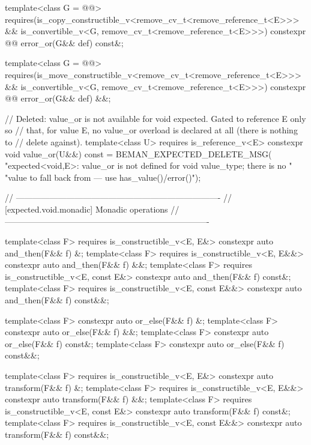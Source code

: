 \begin{codeblock}
{{    template<class G = @@>
      requires(is_copy_constructible_v<remove_cv_t<remove_reference_t<E>>> &&
               is_convertible_v<G, remove_cv_t<remove_reference_t<E>>>)
    constexpr @@ error_or(G&& def) const&;

    template<class G = @@>
      requires(is_move_constructible_v<remove_cv_t<remove_reference_t<E>>> &&
               is_convertible_v<G, remove_cv_t<remove_reference_t<E>>>)
    constexpr @@ error_or(G&& def) &&;

    // Deleted: value_or is not available for void expected. Gated to reference E only so
    // that, for value E, no value_or overload is declared at all (there is nothing to
    // delete against).
    template<class U>
      requires is_reference_v<E>
    constexpr void value_or(U&&) const = BEMAN_EXPECTED_DELETE_MSG(
        "expected<void,E>: value_or is not defined for void value_type; there is no "
        "value to fall back from — use has_value()/error()");

    // -------------------------------------------------------------------------
    // [expected.void.monadic] Monadic operations
    // -------------------------------------------------------------------------

    template<class F>
      requires is_constructible_v<E, E&>
    constexpr auto and_then(F&& f) &;
    template<class F>
      requires is_constructible_v<E, E&&>
    constexpr auto and_then(F&& f) &&;
    template<class F>
      requires is_constructible_v<E, const E&>
    constexpr auto and_then(F&& f) const&;
    template<class F>
      requires is_constructible_v<E, const E&&>
    constexpr auto and_then(F&& f) const&&;

    template<class F> constexpr auto or_else(F&& f) &;
    template<class F> constexpr auto or_else(F&& f) &&;
    template<class F> constexpr auto or_else(F&& f) const&;
    template<class F> constexpr auto or_else(F&& f) const&&;

    template<class F>
      requires is_constructible_v<E, E&>
    constexpr auto transform(F&& f) &;
    template<class F>
      requires is_constructible_v<E, E&&>
    constexpr auto transform(F&& f) &&;
    template<class F>
      requires is_constructible_v<E, const E&>
    constexpr auto transform(F&& f) const&;
    template<class F>
      requires is_constructible_v<E, const E&&>
    constexpr auto transform(F&& f) const&&;

}}
\end{codeblock}
